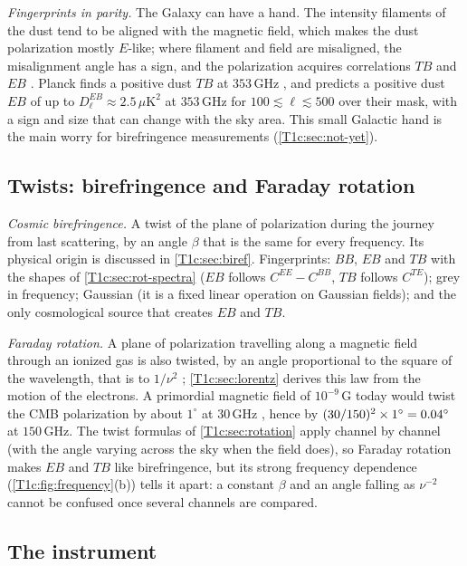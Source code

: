 \emph{Fingerprints in parity.} The Galaxy can have a hand. The intensity filaments of the dust tend to be aligned with the magnetic field, which makes the dust polarization mostly $E$-like; where filament and field are misaligned, the misalignment angle has a sign, and the polarization acquires correlations $TB$ and $EB$ \cite{Clark2021}. Planck finds a positive dust $TB$ at $353\,$GHz \cite{Planck2018XI}, and \cite{Clark2021} predicts a positive dust $EB$ of up to $D_\ell^{EB}\approx2.5\,\mu\mathrm K^2$ at $353\,$GHz for $100\lesssim\ell\lesssim500$ over their mask, with a sign and size that can change with the sky area. This small Galactic hand is the main worry for birefringence measurements (\cref{T1c:sec:not-yet}).

\subsection{Twists: birefringence and Faraday rotation}
\label{T1c:sec:twists}

\emph{Cosmic birefringence.} A twist of the plane of polarization during the journey from last scattering, by an angle $\beta$ that is the same for every frequency. Its physical origin is discussed in \cref{T1c:sec:biref}. Fingerprints: $BB$, $EB$ and $TB$ with the shapes of \cref{T1c:sec:rot-spectra} ($EB$ follows $C^{EE}-C^{BB}$, $TB$ follows $C^{TE}$); grey in frequency; Gaussian (it is a fixed linear operation on Gaussian fields); and the only cosmological source that creates $EB$ and $TB$.

\emph{Faraday rotation.} A plane of polarization travelling along a magnetic field through an ionized gas is also twisted, by an angle proportional to the square of the wavelength, that is to $1/\nu^2$ \cite{KosowskyLoeb1996}; \cref{T1c:sec:lorentz} derives this law from the motion of the electrons. A primordial magnetic field of $10^{-9}\,$G today would twist the CMB polarization by about $1^\circ$ at $30\,$GHz \cite{KosowskyLoeb1996}, hence by $(30/150)^2\times1^\circ=0.04^\circ$ at $150\,$GHz. The twist formulas of \cref{T1c:sec:rotation} apply channel by channel (with the angle varying across the sky when the field does), so Faraday rotation makes $EB$ and $TB$ like birefringence, but its strong frequency dependence (\cref{T1c:fig:frequency}(b)) tells it apart: a constant $\beta$ and an angle falling as $\nu^{-2}$ cannot be confused once several channels are compared.

\subsection{The instrument}
\label{T1c:sec:instrument}

